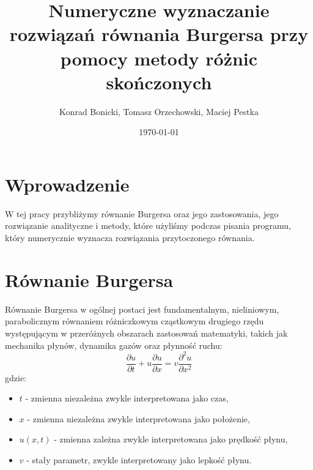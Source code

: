 \documentclass[a4paper,12pt]{article}
\title{Numeryczne wyznaczanie rozwiązań równania Burgersa przy pomocy metody różnic skończonych}
\author{Konrad Bonicki, Tomasz Orzechowski, Maciej Pestka}
\date{\today}
\begin{document}
\maketitle

\tableofcontents
\newpage

\section{Wprowadzenie}
W tej pracy przybliżymy równanie Burgersa oraz jego zastosowania, jego rozwiązanie analityczne i metody, które użyliśmy podczas pisania programu, który numerycznie wyznacza rozwiązania przytoczonego równania.

\section{Równanie Burgersa}
Równanie Burgersa w ogólnej postaci jest fundamentalnym, nieliniowym, parabolicznym równaniem różniczkowym cząstkowym drugiego rzędu występującym w przeróżnych obszarach zastosowań matematyki, takich jak mechanika płynów, dynamika gazów oraz płynność ruchu:
\begin{equation}
\frac{\partial u}{\partial t} + u \frac{\partial u}{\partial x} = v \frac{\partial ^2 u}{\partial x^2}
\end{equation}
gdzie: 
\begin{itemize}
\item $t$ - zmienna niezależna zwykle interpretowana jako czas,
\item $x$ - zmienna niezależna zwykle interpretowana jako położenie,
\item $u(x,t)$ - zmienna zależna zwykle interpretowana jako prędkość płynu,
\item $v$ - stały parametr, zwykle interpretowany jako lepkość płynu.
\end{itemize}
\end{document}
